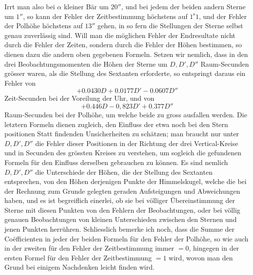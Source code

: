 Irrt man also bei $\alpha$ kleiner Bär um $20''$, und bei jedem der beiden andern Sterne um $1''$, so kann der Fehler der Zeitbestimmung höchstens auf $1^{\mathrm{s}}1$, und der Fehler der Polhöhe höchstens auf $13''$ gehen, in so fern die Stellungen der Sterne selbst genau zuverlässig sind. Will man die möglichen Fehler der Endresultate nicht durch die Fehler der Zeiten, sondern durch die Fehler der Höhen bestimmen, so dienen dazu die andern oben gegebenen Formeln. Setzen wir nemlich, dass in den drei Beobachtungsmomenten die Höhen der Sterne um $D,D',D''$ Raum-Secunden grösser waren, als die Stellung des Sextanten erforderte, so entspringt daraus ein Fehler von
\[
+0.0430D+0.0177D'-0.0607D''
\]
Zeit-Secunden bei der Voreilung der Uhr, und von
\[
+0.446D-0{,}823D'+0.377D''
\]
Raum-Secunden bei der Polhöhe, um welche beide zu gross ausfallen werden. Die letztern Formeln dienen zugleich, den Einfluss der etwa noch bei den Stern%
%
positionen Statt findenden Unsicherheiten zu schätzen; man braucht nur unter $D,D',D''$ die Fehler dieser Positionen in der Richtung der drei Vertical-Kreise und in Secunden des grössten Kreises zu verstehen, um sogleich die gefundenen Formeln für den Einfluss derselben gebrauchen zu können. Es sind nemlich $D,D',D''$ die Unterschiede der Höhen, die der Stellung des Sextanten entsprechen, von den Höhen derjenigen Punkte der Himmelskugel, welche die bei der Rechnung zum Grunde gelegten geraden Aufsteigungen und Abweichungen haben, und es ist begreiflich einerlei, ob sie bei völliger Übereinstimmung der Sterne mit diesen Punkten von den Fehlern der Beobachtungen, oder bei völlig genauen Beobachtungen von kleinen Unterschieden zwischen den Sternen und jenen Punkten herrühren. Schliesslich bemerke ich noch, dass die Summe der Coëfficienten in jeder der beiden Formeln für den Fehler der Polhöhe, so wie auch in der zweiten für den Fehler der Zeitbestimmung immer $=0$, hingegen in der ersten Formel für den Fehler der Zeitbestimmung $=1$ wird, wovon man den Grund bei einigem Nachdenken leicht finden wird.
